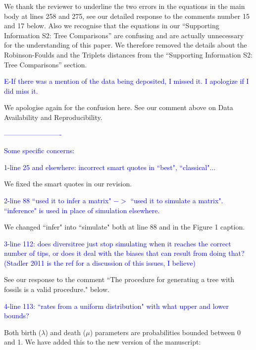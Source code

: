 \documentclass[11pt]{letter}
\begin{document}
\begin{letter}{}
We thank the reviewer to underline the two errors in the equations in the main body at lines 258 and 275, see our detailed response to the comments number 15 and 17 below. Also we recognise that the equations in our ``Supporting Information S2: Tree Comparisons'' are confusing and are actually unnecessary for the understanding of this paper. We therefore removed the details about the Robinson-Foulds and the Triplets distances from the ``Supporting Information S2: Tree Comparisons'' section.


\textcolor{blue}{E-If there was a mention of the data being deposited, I missed it. I apologize if I did miss it.}

We apologise again for the confusion here. See our comment above on Data Availability and Reproducibility.


\textcolor{blue}{-------------------------}

\textcolor{blue}{Some specific concerns:}

\textcolor{blue}{1-line 25 and elsewhere: incorrect smart quotes in ``best", ``classical"...}

We fixed the smart quotes in our revision.


\textcolor{blue}{2-line 88 ``used it to infer a matrix" $->$ ``used it to simulate a matrix". ``inference" is used in place of simulation elsewhere.}

We changed ``infer" into ``simulate" both at line 88 and in the Figure 1 caption.


\textcolor{blue}{3-line 112: does diversitree just stop simulating when it reaches the correct number of tips, or does it deal with the biases that can result from doing that? (Stadler 2011 is the ref for a discussion of this issues, I believe)}

See our response to the comment ``The procedure for generating a tree with fossils is a valid procedure." below.


\textcolor{blue}{4-line 113: ``rates from a uniform distribution" with what upper and lower bounds?}

Both birth ($\lambda$) and death ($\mu$) parameters are probabilities bounded between 0 and 1. We have added this to the new version of the manuscript:



\end{letter}
\end{document}
